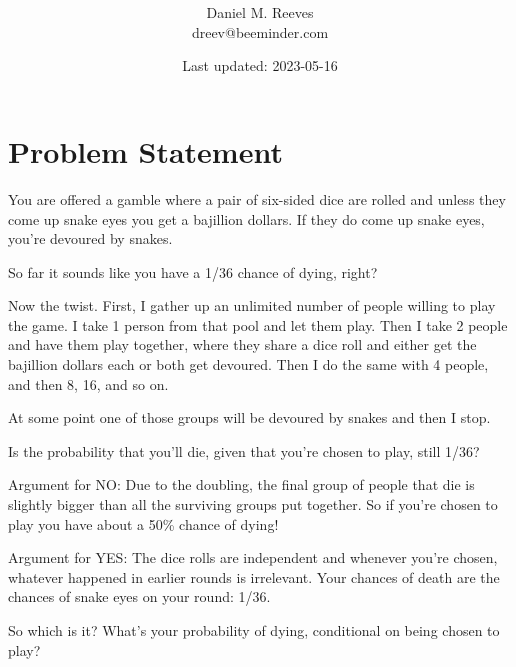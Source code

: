\documentclass[article,twocolumn]{memoir}
\title{\HUGE\textbf{\longtitle}}
\author{Daniel M. Reeves\\dreev@beeminder.com}
\date{Last updated: 2023-05-16}
\begin{document}
\pagestyle{headings}
\maketitle




\chapter*{Problem Statement}

You are offered a gamble where a pair of six-sided dice are rolled and unless they come up snake eyes you get a bajillion dollars. 
If they do come up snake eyes, you're devoured by snakes.

So far it sounds like you have a 1/36 chance of dying, right?

Now the twist. 
First, I gather up an unlimited number of people willing to play the game. 
I take 1 person from that pool and let them play. 
Then I take 2 people and have them play together, where they share a dice roll and either get the bajillion dollars each or both get devoured. 
Then I do the same with 4 people, and then 8, 16, and so on.

At some point one of those groups will be devoured by snakes and then I stop.

Is the probability that you'll die, given that you're chosen to play, still 1/36?

Argument for NO: 
Due to the doubling, the final group of people that die is slightly bigger than all the surviving groups put together. 
So if you're chosen to play you have about a 50\% chance of dying!

Argument for YES: 
The dice rolls are independent and whenever you're chosen, whatever happened in earlier rounds is irrelevant.
Your chances of death are the chances of snake eyes on your round: 1/36.

So which is it? 
What's your probability of dying, conditional on being chosen to play?
\end{document}
